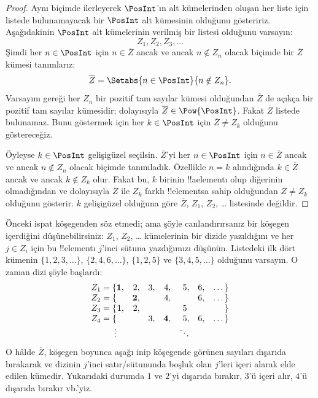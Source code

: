 \begin{proof}
Aynı biçimde ilerleyerek $\PosInt$'ın alt kümelerinden oluşan her liste için listede
bulunamayacak bir $\PosInt$ alt kümesinin olduğunu gösteririz. Aşağıdakinin
$\PosInt$ alt kümelerinin verilmiş bir listesi olduğunu varsayın:
\[
Z_{1}, Z_{2}, Z_{3}, \dots
\]
Şimdi her $n\in\PosInt$ için $n\in\overline{Z}$ ancak ve ancak $n\notin Z_n$
olacak biçimde bir $\overline{Z}$ kümesi tanımlarız:
\[
\overline{Z} = \Setabs{n \in \PosInt}{n \notin Z_n}.
\]
Varsayım gereği her $Z_n$ bir pozitif tam sayılar kümesi olduğundan
$\overline{Z}$ de açıkça bir pozitif tam sayılar kümesidir; dolayısıyla
$\overline{Z}\in\Pow{\PosInt}$. Fakat $\overline{Z}$ listede bulunamaz.
Bunu göstermek için her $k\in\PosInt$ için $\overline{Z}\neq Z_k$ olduğunu
göstereceğiz.

Öyleyse $k\in\PosInt$ gelişigüzel seçilsin. $\overline{Z}$'yi her
$n\in\PosInt$ için $n\in\overline{Z}$ ancak ve ancak $n\notin Z_n$ olacak
biçimde tanımladık. Özellikle $n=k$ alındığında $k\in\overline{Z}$ ancak ve
ancak $k\notin Z_k$ olur. Fakat bu, $k$ birinin !!a{element}{}ı olup diğerinin
olmadığından ve dolayısıyla $\overline{Z}$ ile $Z_k$ farklı !!{element}s{}a
sahip olduğundan $\overline{Z}\neq Z_k$ olduğunu gösterir. $k$ gelişigüzel
olduğuna göre $\overline{Z}$, $Z_1$, $Z_2$, \dots{} listesinde değildir.
\end{proof}

\begin{explain}
Önceki ispat köşegenden söz etmedi; ama şöyle canlandırırsanız bir köşegen
içerdiğini düşünebilirsiniz: $Z_1$, $Z_2$, \dots{} kümelerinin bir dizide
yazıldığını ve her $j\in Z_i$ için bu !!{element}{}ı $j$'inci sütuna yazdığımızı
düşünün. Listedeki ilk dört kümenin $\{1,2,3,\dots\}$, $\{2,4,6,\dots\}$,
$\{1,2,5\}$ ve $\{3,4,5,\dots\}$ olduğunu varsayın. O zaman dizi şöyle
başlardı:
\[
\begin{array}{r@{}rrrrrrr}
  Z_1 = \{ & \mathbf{1}, & 2, & 3, & 4, & 5, & 6, & \dots\}\\
  Z_2 = \{ &  & \mathbf{2}, &  & 4, &  & 6, & \dots\}\\
  Z_3 = \{ & 1, & 2, &  &  & 5\phantom{,} &  & \}\\
  Z_4 = \{ &  &  & 3, & \mathbf{4}, & 5, & 6, & \dots\}\\
  \vdots & & & & & \ddots
\end{array}
\]
O hâlde $\overline{Z}$, köşegen boyunca aşağı inip köşegende görünen
sayıları dışarıda bırakarak ve dizinin $j$'inci satır/sütununda boşluk olan
$j$'leri içeri alarak elde edilen kümedir. Yukarıdaki durumda $1$ ve $2$'yi
dışarıda bırakır, $3$'ü içeri alır, $4$'ü dışarıda bırakır vb.'yiz.
\end{explain}

